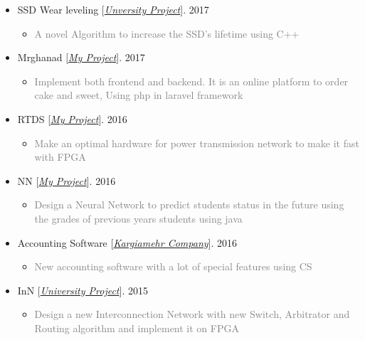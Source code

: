 \documentclass[10pt,a4paper,sans]{moderncv} %
\begin{document}
\begin{itemize}
		\item SSD Wear leveling [\href{https://sbu.ac.ir/Cols/CSE/Pages/default.aspx/}{\emph{Unversity Project}}]. \hfill 2017
		\begin{itemize}
			\item \textcolor{gray} {A novel Algorithm to increase the SSD’s lifetime using C++}
		\end{itemize}

		\item Mrghanad [\href{mailto:ma.mohammadizadeh@gmail.com}{\emph{My Project}}]. \hfill 2017
		\begin{itemize}
			\item \textcolor{gray} {Implement both frontend and backend. It is an online platform to order cake and sweet, Using php in laravel framework}
		\end{itemize}

		\item RTDS [\href{mailto:ma.mohammadizadeh@gmail.com}{\emph{My Project}}]. \hfill 2016
		\begin{itemize}
			\item \textcolor{gray} {Make an optimal hardware for power transmission network to make it fast with FPGA}
		\end{itemize}

		\item NN [\href{mailto:ma.mohammadizadeh@gmail.com}{\emph{My Project}}]. \hfill 2016
		\begin{itemize}
			\item \textcolor{gray} {Design a Neural Network to predict students status in the future using the grades of previous years students using java}
		\end{itemize}

		\item Accounting Software [\href{http://#/}{\emph{Kargiamehr Company}}]. \hfill 2016
		\begin{itemize}
			\item \textcolor{gray} {New accounting software with a lot of special features using CS}
		\end{itemize}

		\item InN [\href{https://sbu.ac.ir/Cols/CSE/Pages/default.aspx/}{\emph{University Project}}]. \hfill 2015
		\begin{itemize}
			\item \textcolor{gray} {Design a new Interconnection Network with new Switch, Arbitrator and Routing algorithm and implement it on FPGA}
		\end{itemize}


\end{itemize}
\end{document}
